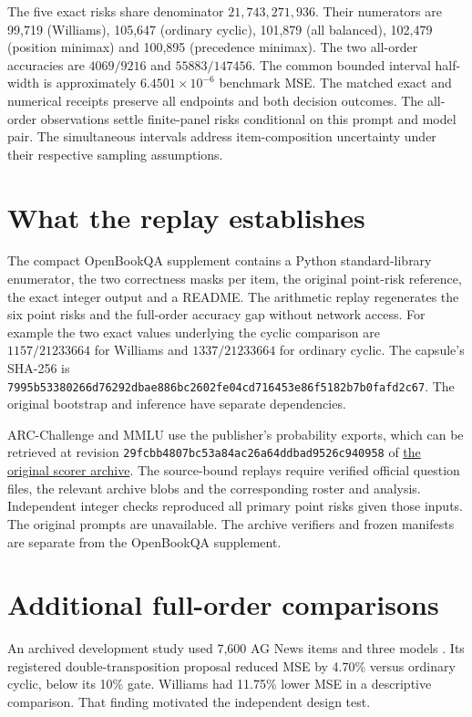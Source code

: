 The five exact risks share denominator \(21{,}743{,}271{,}936\).
Their numerators are 99,719 (Williams), 105,647 (ordinary cyclic),
101,879 (all balanced), 102,479 (position minimax) and 100,895
(precedence minimax). The two all-order accuracies are
\(4069/9216\) and \(55883/147456\). The common bounded interval
half-width is approximately \(6.4501\times 10^{-6}\) benchmark MSE.
The matched exact and numerical receipts preserve all endpoints and
both decision outcomes. The all-order observations settle finite-panel
risks conditional on this prompt and model pair. The simultaneous
intervals address item-composition uncertainty under their respective
sampling assumptions.

\section{What the replay establishes}
\label{app:artifacts}

The compact OpenBookQA supplement contains a Python standard-library
enumerator, the two correctness masks per item, the original point-risk
reference, the exact integer output and a README. The arithmetic replay
regenerates the six point risks and the full-order accuracy gap without
network access. For example the two exact values underlying the cyclic
comparison are \(1157/21233664\) for Williams and \(1337/21233664\) for
ordinary cyclic. The capsule's SHA-256 is
\texttt{7995b53380266d76292dbae886bc2602fe04cd716453e86f5182b7b0fafd2c67}.
The original bootstrap and inference have separate dependencies.

ARC-Challenge and MMLU use the publisher's probability exports,
which can be retrieved at revision
\texttt{29fcbb4807bc53a84ac26a64ddbad9526c940958} of
\href{https://github.com/chujiezheng/LLM-MCQ-Bias_data/tree/29fcbb4807bc53a84ac26a64ddbad9526c940958}{the original scorer archive}.
The source-bound replays require verified official question files,
the relevant archive blobs and the corresponding roster and analysis.
Independent integer checks reproduced all primary point risks given those
inputs. The original prompts are unavailable. The archive verifiers and
frozen manifests are separate from the OpenBookQA supplement.

\section{Additional full-order comparisons}
\label{app:other-panels}
An archived development study used 7,600 AG News items and three
models \citep{gao2026}. Its registered double-transposition proposal
reduced MSE by 4.70\% versus ordinary cyclic, below its 10\% gate.
Williams had 11.75\% lower MSE in a descriptive comparison. That
finding motivated the independent design test.

